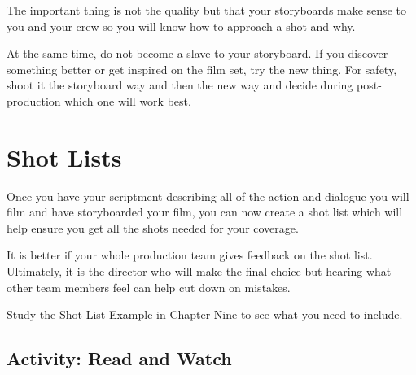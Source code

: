 \documentclass[
]{book}
\begin{document}
The important thing is not the quality but that your storyboards make sense to you and your crew so you will know how to approach a shot and why.

At the same time, do not become a slave to your storyboard. If you discover something better or get inspired on the film set, try the new thing. For safety, shoot it the storyboard way and then the new way and decide during post-production which one will work best.

\hypertarget{shot-lists}{%
\section{Shot Lists}\label{shot-lists}}

Once you have your scriptment describing all of the action and dialogue you will film and have storyboarded your film, you can now create a shot list which will help ensure you get all the shots needed for your coverage.

It is better if your whole production team gives feedback on the shot list. Ultimately, it is the director who will make the final choice but hearing what other team members feel can help cut down on mistakes.

Study the Shot List Example in Chapter Nine to see what you need to include.

\hypertarget{activity-read-and-watch-3}{%
\subsection*{Activity: Read and Watch}\label{activity-read-and-watch-3}}
\end{document}
